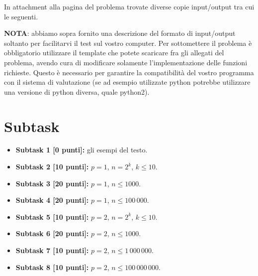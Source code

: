 
In attachment alla pagina del problema trovate diverse copie input/output tra cui le seguenti.
\vspace{0.5cm}

\esempio{

}{}

\esempio{

}{}

\esempio{

}{}

\esempio{

}{}

\esempio{

}{}


\textbf{NOTA}: abbiamo sopra fornito una descrizione del formato di input/output soltanto per facilitarvi il test sul vostro computer. Per sottomettere il problema è obbligatorio utilizzare il template che potete scaricare fra gli allegati del problema, avendo cura di modificare solamente l'implementazione delle funzioni richieste.
Questo è necessario per garantire la compatibilità del vostro programma con il sistema di valutazione (se ad esempio utilizzate python potrebbe utilizzare una versione di python diversa, quale python2).


\section*{Subtask}
\begin{itemize}
  \item \textbf{Subtask 1 [0 punti]:} gli esempi del testo.
  \item \textbf{Subtask 2 [10 punti]:} $p = 1$, $n=2^k$, $k\leq 10$.
  \item \textbf{Subtask 3 [20 punti]:} $p = 1$, $n\leq 1000$.
  \item \textbf{Subtask 4 [20 punti]:} $p = 1$, $n\leq 100\,000$.
  \item \textbf{Subtask 5 [10 punti]:} $p = 2$, $n=2^k$, $k\leq 10$.
  \item \textbf{Subtask 6 [20 punti]:} $p = 2$, $n\leq 1000$.
  \item \textbf{Subtask 7 [10 punti]:} $p = 2$, $n\leq 1\,000\,000$.
  \item \textbf{Subtask 8 [10 punti]:} $p = 2$, $n\leq 100\,000\,000$.
\end{itemize}
